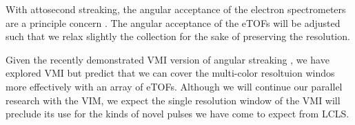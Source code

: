 With attosecond streaking, the angular acceptance of the electron spectrometers are a principle concern \cite{Worner2018}.
The angular acceptance of the eTOFs will be adjusted such that we relax slightly the collection for the sake of preserving the resolution.

Given the recently demonstrated VMI version of angular streaking \cite{attoclockVMI2013}, we have explored VMI \cite{James2018} but predict that we can cover the multi-color resoltuion windos more effectively with an array of eTOFs.
Although we will continue our parallel research with the VIM, we expect the single resolution window of the VMI will preclude its use for the kinds of novel pulses we have come to expect from LCLS.


